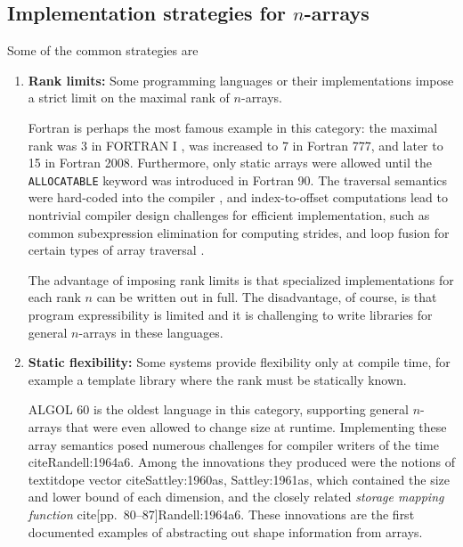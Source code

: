 \documentclass[preprint]{sigplanconf}
\newcommand{\ALGOL}{A\textsc{LGOL}}
\newcommand{\code}[1]{\texttt{#1}}
\begin{document}
\subsection{Implementation strategies for $n$-arrays}

Some of the common strategies are

\begin{enumerate}

\item {\bf Rank limits:} Some programming languages or their implementations
impose a strict limit on the maximal rank of $n$-arrays.

Fortran is perhaps the most famous example in this category: the maximal rank
was 3 in FORTRAN I \cite{Backus:1957fa}, was increased to 7 in Fortran 777,
and later to 15 in Fortran 2008. Furthermore, only static arrays were allowed
until the \code{ALLOCATABLE} keyword was introduced in Fortran 90. The
traversal semantics were hard-coded into the compiler \cite[pp.~10--
11]{Backus:1956pr}, and index-to-offset computations lead to nontrivial
compiler design challenges for efficient implementation, such as common
subexpression elimination for computing strides, and loop fusion for certain
types of array traversal \cite{Busam:1969oe}.



The advantage of imposing rank limits is that specialized implementations for
each rank $n$ can be written out in full. The disadvantage, of course, is that
program expressibility is limited and it is challenging to write libraries for
general $n$-arrays in these languages.

\item {\bf Static flexibility:} Some systems provide flexibility only at
compile time, for example a template library where the rank must be statically
known.

\ALGOL{} 60 is the oldest language in this category, supporting general
$n$-arrays that were even allowed to change size at runtime. Implementing
these array semantics posed numerous challenges for compiler writers of the
time cite{Randell:1964a6}. Among the innovations they produced were the
notions of textit{dope vector} cite{Sattley:1960as, Sattley:1961as}, which
contained the size and lower bound of each dimension, and the closely related
\textit{storage mapping function} cite[pp.~80--87]{Randell:1964a6}. These
innovations are the first documented examples of abstracting out shape
information from arrays.


\end{enumerate}
\end{document}
